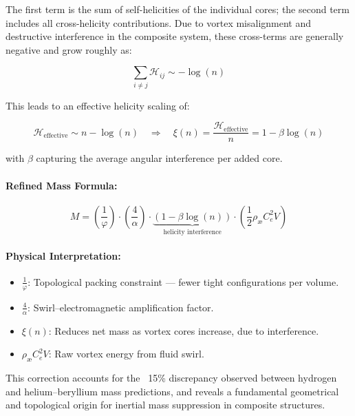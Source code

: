 \documentclass[12pt]{article}
\begin{document}
The first term is the sum of self-helicities of the individual cores; the second term includes all cross-helicity contributions. Due to vortex misalignment and destructive interference in the composite system, these cross-terms are generally negative and grow roughly as:

\[
\sum_{i \neq j} \mathcal{H}_{ij} \sim -\log(n)
\]

This leads to an effective helicity scaling of:

\[
\mathcal{H}_{\text{effective}} \sim n - \log(n)
\quad \Rightarrow \quad
\xi(n) = \frac{\mathcal{H}_{\text{effective}}}{n} = 1 - \beta \log(n)
\]

with \( \beta \) capturing the average angular interference per added core.

\paragraph{Refined Mass Formula:}

\begin{equation}
\boxed{
M = \left( \frac{1}{\varphi} \right) \cdot \left( \frac{4}{\alpha} \right) \cdot \underbrace{\left(1 - \beta \log(n)\right)}_{\text{helicity interference}} \cdot \left( \frac{1}{2} \rho_\text{\ae} C_e^2 V \right)
}
\end{equation}

\paragraph{Physical Interpretation:}
\begin{itemize}
  \item \( \frac{1}{\varphi} \): Topological packing constraint — fewer tight configurations per volume.
  \item \( \frac{4}{\alpha} \): Swirl–electromagnetic amplification factor.
  \item \( \xi(n) \): Reduces net mass as vortex cores increase, due to interference.
  \item \( \rho_\text{\ae} C_e^2 V \): Raw vortex energy from fluid swirl.
\end{itemize}

\noindent
This correction accounts for the ~15\% discrepancy observed between hydrogen and helium–beryllium mass predictions, and reveals a fundamental geometrical and topological origin for inertial mass suppression in composite structures.


\ifdefined\standalonechapter\else
    
    
    
\end{document}
